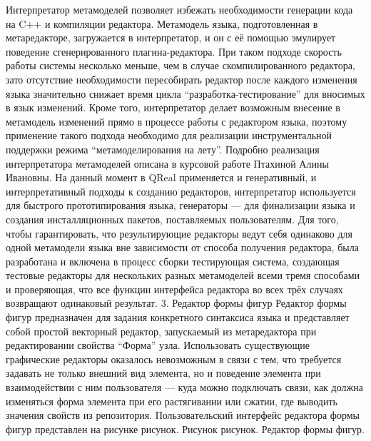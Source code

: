 	Интерпретатор метамоделей позволяет избежать необходимости генерации кода на C++ и компиляции редактора. Метамодель языка, подготовленная в метаредакторе, загружается в интерпретатор, и он с её помощью эмулирует поведение сгенерированного плагина-редактора. При таком подходе скорость работы системы несколько меньше, чем в случае скомпилированного редактора, зато отсутствие необходимости пересобирать редактор после каждого изменения языка значительно снижает время цикла “разработка-тестирование” для вносимых в язык изменений. Кроме того, интерпретатор делает возможным внесение в метамодель изменений прямо в процессе работы с редактором языка, поэтому применение такого подхода необходимо для реализации инструментальной поддержки режима “метамоделирования на лету”. Подробно реализация интерпретатора метамоделей описана в курсовой работе Птахиной Алины Ивановны. На данный момент в QReal применяется и генеративный, и интерпретативный подходы к созданию редакторов, интерпретатор используется для быстрого прототипирования языка, генераторы --- для финализации языка и создания инсталляционных пакетов, поставляемых пользователям. Для того, чтобы гарантировать, что результирующие редакторы ведут себя одинаково для одной метамодели языка вне зависимости от способа получения редактора, была разработана и включена в процесс сборки тестирующая система, создающая тестовые редакторы для нескольких разных метамоделей всеми тремя способами и проверяющая, что все функции интерфейса редактора во всех трёх случаях возвращают одинаковый результат.
3. Редактор формы фигур
	Редактор формы фигур предназначен для задания конкретного синтаксиса языка и представляет собой простой векторный редактор, запускаемый из метаредактора при редактировании свойства “Форма” узла. Использовать существующие графические редакторы оказалось невозможным в связи с тем, что требуется задавать не только внешний вид элемента, но и поведение элемента при взаимодействии с ним пользователя --- куда можно подключать связи, как должна изменяться форма элемента при его растягивании или сжатии, где выводить значения свойств из репозитория.
	Пользовательский интерфейс редактора формы фигур представлен на рисунке рисунок.
Рисунок рисунок. Редактор формы фигур.

